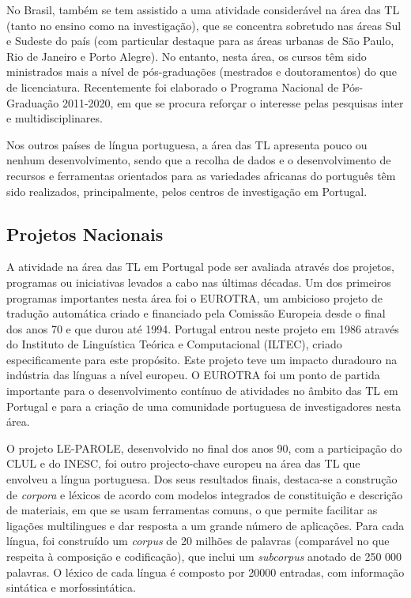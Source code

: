 \documentclass[]{../metanetpaper}
\begin{document}
\begin{multicols}{2}
No Brasil, também se tem assistido a uma atividade considerável na área das TL (tanto no ensino como na investigação), que se concentra sobretudo nas áreas Sul e Sudeste do país (com particular destaque para as áreas urbanas de São Paulo, Rio de Janeiro e Porto Alegre). No entanto, nesta área, os cursos têm sido ministrados mais a nível de pós-graduações (mestrados e doutoramentos) do que de licenciatura. Recentemente foi elaborado o Programa Nacional de Pós-Graduação 2011-2020, em que se procura reforçar o interesse pelas pesquisas inter e multidisciplinares.

Nos outros países de língua portuguesa, a área das TL apresenta pouco ou nenhum desenvolvimento, sendo que a recolha de dados e o desenvolvimento de recursos e ferramentas orientados para as variedades africanas do português têm sido realizados, principalmente, pelos centros de investigação em Portugal.

\subsection{Projetos Nacionais}

 A atividade na área das TL em Portugal pode ser avaliada através dos projetos, programas ou iniciativas levados a cabo nas últimas décadas. Um dos primeiros programas importantes nesta área foi o EUROTRA, um ambicioso projeto de tradução automática criado e financiado pela Comissão Europeia desde o final dos anos 70 e que durou até 1994. Portugal entrou neste projeto em 1986 através do Instituto de Linguística Teórica e Computacional (ILTEC), criado especificamente para este propósito. Este projeto teve um impacto duradouro na indústria das línguas a nível europeu. O EUROTRA foi um ponto de partida importante para o desenvolvimento contínuo de atividades no âmbito das TL em Portugal e para a criação de uma comunidade portuguesa de investigadores nesta área.

O projeto LE-PAROLE, desenvolvido no final dos anos 90, com a participação do CLUL e do INESC, foi outro projecto-chave europeu na área das TL que envolveu a língua portuguesa. Dos seus resultados finais, destaca-se a construção de \textit{corpora} e léxicos de acordo com modelos integrados de constituição e descrição de materiais, em que se usam ferramentas comuns, o que permite facilitar as ligações multilingues e dar resposta a um grande número de aplicações. Para cada língua, foi construído um \textit{corpus} de 20 milhões de palavras (comparável no que res\-pei\-ta à composição e codificação), que inclui um \textit{subcorpus} anotado de 250 000 palavras. O léxico de cada língua é composto por 20000 entradas, com informação sintática e morfossintática.


\end{multicols}
\end{document}
